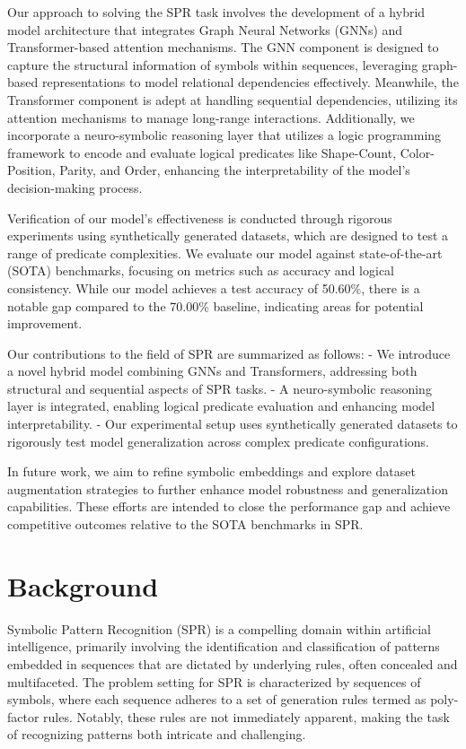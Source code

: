 \documentclass{article}
\begin{document}
Our approach to solving the SPR task involves the development of a hybrid model architecture that integrates Graph Neural Networks (GNNs) and Transformer-based attention mechanisms. The GNN component is designed to capture the structural information of symbols within sequences, leveraging graph-based representations to model relational dependencies effectively. Meanwhile, the Transformer component is adept at handling sequential dependencies, utilizing its attention mechanisms to manage long-range interactions. Additionally, we incorporate a neuro-symbolic reasoning layer that utilizes a logic programming framework to encode and evaluate logical predicates like Shape-Count, Color-Position, Parity, and Order, enhancing the interpretability of the model’s decision-making process.

Verification of our model’s effectiveness is conducted through rigorous experiments using synthetically generated datasets, which are designed to test a range of predicate complexities. We evaluate our model against state-of-the-art (SOTA) benchmarks, focusing on metrics such as accuracy and logical consistency. While our model achieves a test accuracy of 50.60\%, there is a notable gap compared to the 70.00\% baseline, indicating areas for potential improvement.

Our contributions to the field of SPR are summarized as follows:
- We introduce a novel hybrid model combining GNNs and Transformers, addressing both structural and sequential aspects of SPR tasks.
- A neuro-symbolic reasoning layer is integrated, enabling logical predicate evaluation and enhancing model interpretability.
- Our experimental setup uses synthetically generated datasets to rigorously test model generalization across complex predicate configurations.

In future work, we aim to refine symbolic embeddings and explore dataset augmentation strategies to further enhance model robustness and generalization capabilities. These efforts are intended to close the performance gap and achieve competitive outcomes relative to the SOTA benchmarks in SPR.

\section{Background}
Symbolic Pattern Recognition (SPR) is a compelling domain within artificial intelligence, primarily involving the identification and classification of patterns embedded in sequences that are dictated by underlying rules, often concealed and multifaceted. The problem setting for SPR is characterized by sequences of symbols, where each sequence adheres to a set of generation rules termed as poly-factor rules. Notably, these rules are not immediately apparent, making the task of recognizing patterns both intricate and challenging.
\end{document}
